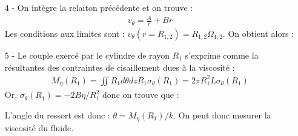 \documentclass{report}
\begin{document}
\begin{itemize}
	\item[4 - ] On intègre la relaiton précédente et on trouve :
	\begin{align*}
		v_\theta = \frac{A}{r} + Br
	\end{align*}
	Les conditions aux limites sont : $v_\theta(r=R_{1,2})=R_{1,2}\Omega_{1,2}$. On obtient alors : 
	
	\noindent{}

\item[5 - ] Le couple exercé par le cylindre de rayon $R_1$ s'exprime comme la résultantes des contraintes de cisaillement dues à la viscosité :
\begin{align*}
	M_{\eta}(R_1)=\iint R_1d\theta dz R_1\sigma_\theta(R_1)= 2\pi R_1^2L\sigma_\theta(R_1)
\end{align*}
Or, $\sigma_\theta(R_1) = -2B\eta/R_1^2$ donc on trouve que :

\noindent{}

L'angle du ressort est donc : $\theta = M_{\eta}(R_1)/k$. On peut donc mesurer la viscosité du fluide.

\end{itemize}
\end{document}
